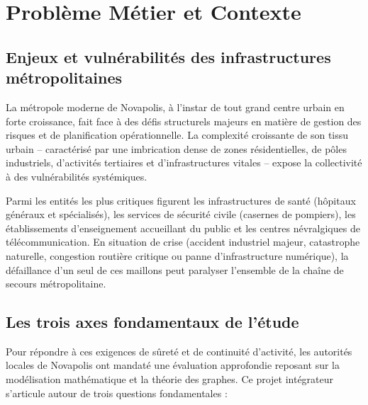 \section{Problème Métier et Contexte}

\subsection{Enjeux et vulnérabilités des infrastructures métropolitaines}
La métropole moderne de Novapolis, à l'instar de tout grand centre urbain en forte croissance, fait face à des défis structurels majeurs en matière de gestion des risques et de planification opérationnelle. La complexité croissante de son tissu urbain – caractérisé par une imbrication dense de zones résidentielles, de pôles industriels, d'activités tertiaires et d'infrastructures vitales – expose la collectivité à des vulnérabilités systémiques. 

Parmi les entités les plus critiques figurent les infrastructures de santé (hôpitaux généraux et spécialisés), les services de sécurité civile (casernes de pompiers), les établissements d'enseignement accueillant du public et les centres névralgiques de télécommunication. En situation de crise (accident industriel majeur, catastrophe naturelle, congestion routière critique ou panne d'infrastructure numérique), la défaillance d'un seul de ces maillons peut paralyser l'ensemble de la chaîne de secours métropolitaine.

\subsection{Les trois axes fondamentaux de l'étude}
Pour répondre à ces exigences de sûreté et de continuité d'activité, les autorités locales de Novapolis ont mandaté une évaluation approfondie reposant sur la modélisation mathématique et la théorie des graphes. Ce projet intégrateur s'articule autour de trois questions fondamentales :

